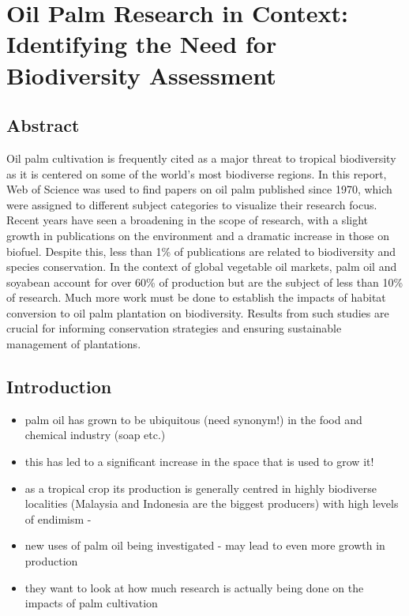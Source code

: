 \section*{Oil Palm Research in Context: Identifying the Need for Biodiversity Assessment \cite{Turner2008}}

\subsection*{Abstract}
Oil palm cultivation is frequently cited as a major threat to tropical biodiversity as it is centered on some of the world's most biodiverse regions. In this report, Web of Science was used to find papers on oil palm published since 1970, which were assigned to different subject categories to visualize their research focus. Recent years have seen a broadening in the scope of research, with a slight growth in publications on the environment and a dramatic increase in those on biofuel. Despite this, less than 1\% of publications are related to biodiversity and species conservation. In the context of global vegetable oil markets, palm oil and soyabean account for over 60\% of production but are the subject of less than 10\% of research. Much more work must be done to establish the impacts of habitat conversion to oil palm plantation on biodiversity. Results from such studies are crucial for informing conservation strategies and ensuring sustainable management of plantations.

\subsection*{Introduction}
\begin{itemize}
	\item palm oil has grown to be ubiquitous (need synonym!) in the food and chemical industry (soap etc.) 
	\item this has led to a significant increase in the space that is used to grow it!
	\item as a tropical crop its production is generally centred in highly biodiverse localities (Malaysia and Indonesia are the biggest producers)  with high levels of endimism - \citep{Basiron2007}
	\item new uses of palm oil being investigated - may lead to even more growth in production
	\item they want to look at how much research is actually being done on the impacts of palm cultivation
\end{itemize}

